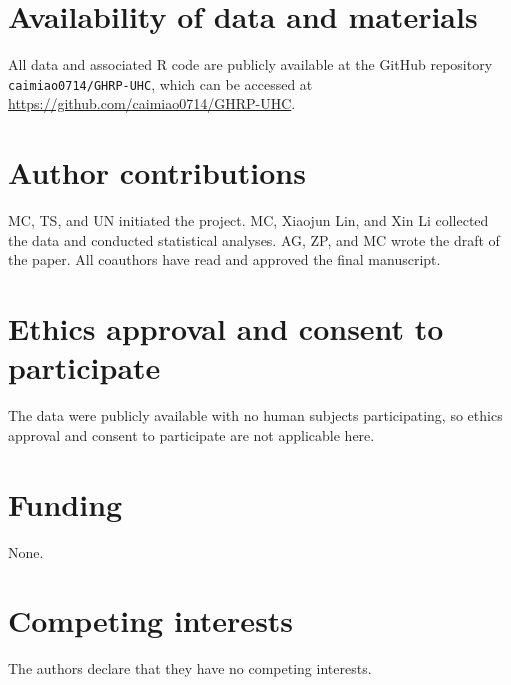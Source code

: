 \documentclass[]{elsarticle} %
\begin{document}
\hypertarget{availability-of-data-and-materials}{%
\section*{Availability of data and materials}\label{availability-of-data-and-materials}}

All data and associated R code are publicly available at the GitHub repository \texttt{caimiao0714/GHRP-UHC}, which can be accessed at \url{https://github.com/caimiao0714/GHRP-UHC}.

\hypertarget{author-contributions}{%
\section*{Author contributions}\label{author-contributions}}

MC, TS, and UN initiated the project. MC, Xiaojun Lin, and Xin Li collected the data and conducted statistical analyses. AG, ZP, and MC wrote the draft of the paper. All coauthors have read and approved the final manuscript.

\hypertarget{ethics-approval-and-consent-to-participate}{%
\section*{Ethics approval and consent to participate}\label{ethics-approval-and-consent-to-participate}}

The data were publicly available with no human subjects participating, so ethics approval and consent to participate are not applicable here.

\hypertarget{funding}{%
\section*{Funding}\label{funding}}

None.

\hypertarget{competing-interests}{%
\section*{Competing interests}\label{competing-interests}}

The authors declare that they have no competing interests.
\end{document}
